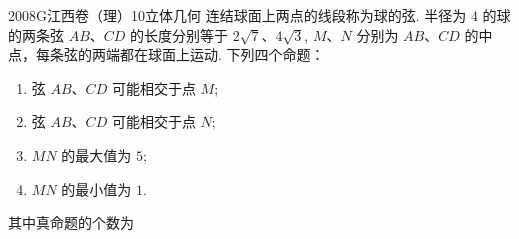 
\begin{problem}{2008}{G}{江西卷（理）}{10}{立体几何}
连结球面上两点的线段称为球的弦. 半径为 $ 4 $ 的球的两条弦 $ AB $、$ CD $ 的长度分别等于 $ 2\sqrt{7} $、$ 4\sqrt{3} $, $ M $、$ N $ 分别为 $ AB $、$ CD $ 的中点，每条弦的两端都在球面上运动. 下列四个命题：
\begin{enumerate}
\item 弦 $ AB $、$ CD $ 可能相交于点 $ M $;
\item 弦 $ AB $、$ CD $ 可能相交于点 $ N $;
\item $ MN $ 的最大值为 $ 5 $;
\item $ MN $ 的最小值为 $ 1 $.
\end{enumerate}
其中真命题的个数为
\begin{choices}
\end{choices}
\end{problem}

\begin{answer}

\end{answer}

\begin{solutions}

\end{solutions}